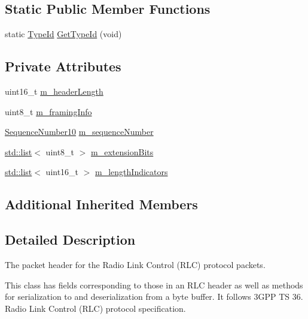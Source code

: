 \subsection*{Static Public Member Functions}
\begin{DoxyCompactItemize}
\item 
static \hyperlink{classns3_1_1TypeId}{Type\+Id} \hyperlink{classns3_1_1LteRlcHeader_a4c247953d8411d9b6a08b15db8761002}{Get\+Type\+Id} (void)
\end{DoxyCompactItemize}
\subsection*{Private Attributes}
\begin{DoxyCompactItemize}
\item 
uint16\+\_\+t \hyperlink{classns3_1_1LteRlcHeader_a75ea7af38421120ae0550c1977de4c1c}{m\+\_\+header\+Length}
\item 
uint8\+\_\+t \hyperlink{classns3_1_1LteRlcHeader_a04ba07b60e76c561767f53295a830b39}{m\+\_\+framing\+Info}
\item 
\hyperlink{classns3_1_1SequenceNumber10}{Sequence\+Number10} \hyperlink{classns3_1_1LteRlcHeader_a345256a1a41193cae2f08b9918e438fc}{m\+\_\+sequence\+Number}
\item 
\hyperlink{openflow-interface_8h_afd9bcfa176617760671b67580f536fa7}{std\+::list}$<$ uint8\+\_\+t $>$ \hyperlink{classns3_1_1LteRlcHeader_a13cb89b13e1ac8572c960b764a30c69b}{m\+\_\+extension\+Bits}
\item 
\hyperlink{openflow-interface_8h_afd9bcfa176617760671b67580f536fa7}{std\+::list}$<$ uint16\+\_\+t $>$ \hyperlink{classns3_1_1LteRlcHeader_a7cc563904c11ad15d6e859521223ec46}{m\+\_\+length\+Indicators}
\end{DoxyCompactItemize}
\subsection*{Additional Inherited Members}


\subsection{Detailed Description}
The packet header for the Radio Link Control (R\+LC) protocol packets. 

This class has fields corresponding to those in an R\+LC header as well as methods for serialization to and deserialization from a byte buffer. It follows 3\+G\+PP TS 36. Radio Link Control (R\+LC) protocol specification. 

